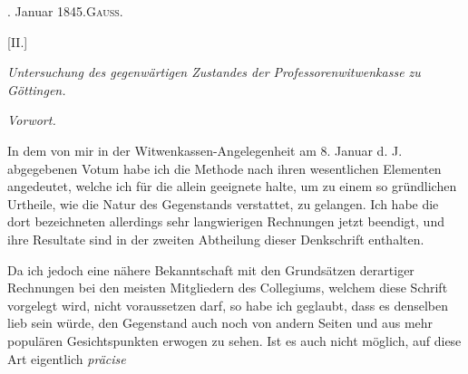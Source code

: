 . Januar 1845.\hfill\textsc{Gauss.}

\begin{center}
{\large [II.]\par}\medskip
\textit{Untersuchung des gegenwärtigen Zustandes der Professorenwitwenkasse zu Göttingen.}\par\medskip
\textit{Vorwort.}\par
\end{center}
\noindent\hspace*{\parindent}In dem von mir in der Witwenkassen-Angelegenheit am 8. Januar d. J. abgegebenen Votum habe ich die Methode nach ihren wesentlichen Elementen angedeutet, welche ich für die allein geeignete halte, um zu einem so gründlichen Urtheile, wie die Natur des Gegenstands verstattet, zu gelangen. Ich habe die dort bezeichneten allerdings sehr langwierigen Rechnungen jetzt beendigt, und ihre Resultate sind in der zweiten Abtheilung dieser Denkschrift enthalten.

Da ich jedoch eine nähere Bekanntschaft mit den Grundsätzen derartiger Rechnungen bei den meisten Mitgliedern des Collegiums, welchem diese Schrift vorgelegt wird, nicht voraussetzen darf, so habe ich geglaubt, dass es denselben lieb sein würde, den Gegenstand auch noch von andern Seiten und aus mehr populären Gesichtspunkten erwogen zu sehen. Ist es auch nicht möglich, auf diese Art eigentlich \textit{präcise}
